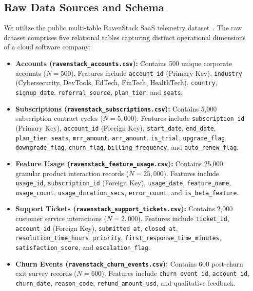 \documentclass[pdflatex,sn-mathphys-num]{sn-jnl}
\begin{document}
\subsection{Raw Data Sources and Schema}
We utilize the public multi-table RavenStack SaaS telemetry dataset~\cite{rivalytics2025ravenstack}. The raw dataset comprises five relational tables capturing distinct operational dimensions of a cloud software company:
\begin{itemize}
    \item \textbf{Accounts (\texttt{ravenstack\_accounts.csv}):} Contains 500 unique corporate accounts ($N=500$). Features include \texttt{account\_id} (Primary Key), \texttt{industry} (Cybersecurity, DevTools, EdTech, FinTech, HealthTech), \texttt{country}, \texttt{signup\_date}, \texttt{referral\_source}, \texttt{plan\_tier}, and \texttt{seats}.
    \item \textbf{Subscriptions (\texttt{ravenstack\_subscriptions.csv}):} Contains 5,000 subscription contract cycles ($N=5{,}000$). Features include \texttt{subscription\_id} (Primary Key), \texttt{account\_id} (Foreign Key), \texttt{start\_date}, \texttt{end\_date}, \texttt{plan\_tier}, \texttt{seats}, \texttt{mrr\_amount}, \texttt{arr\_amount}, \texttt{is\_trial}, \texttt{upgrade\_flag}, \texttt{downgrade\_flag}, \texttt{churn\_flag}, \texttt{billing\_frequency}, and \texttt{auto\_renew\_flag}.
    \item \textbf{Feature Usage (\texttt{ravenstack\_feature\_usage.csv}):} Contains 25,000 granular product interaction records ($N=25{,}000$). Features include \texttt{usage\_id}, \texttt{subscription\_id} (Foreign Key), \texttt{usage\_date}, \texttt{feature\_name}, \texttt{usage\_count}, \texttt{usage\_duration\_secs}, \texttt{error\_count}, and \texttt{is\_beta\_feature}.
    \item \textbf{Support Tickets (\texttt{ravenstack\_support\_tickets.csv}):} Contains 2,000 customer service interactions ($N=2{,}000$). Features include \texttt{ticket\_id}, \texttt{account\_id} (Foreign Key), \texttt{submitted\_at}, \texttt{closed\_at}, \texttt{resolution\_time\_hours}, \texttt{priority}, \texttt{first\_response\_time\_minutes}, \texttt{satisfaction\_score}, and \texttt{escalation\_flag}.
    \item \textbf{Churn Events (\texttt{ravenstack\_churn\_events.csv}):} Contains 600 post-churn exit survey records ($N=600$). Features include \texttt{churn\_event\_id}, \texttt{account\_id}, \texttt{churn\_date}, \texttt{reason\_code}, \texttt{refund\_amount\_usd}, and qualitative feedback.
\end{itemize}
\end{document}
